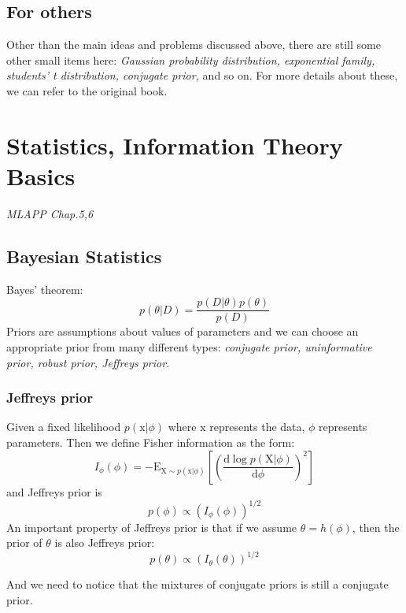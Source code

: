 \documentclass{article}
\newcommand{\mrm}{\mathrm}
\begin{document}
\subsection*{For others}
Other than the main ideas and problems discussed above, there are still some other small items here: \emph{Gaussian probability distribution, exponential family, students' t distribution, conjugate prior, } and so on. For more details about these, we can refer to the original book. 

\section{Statistics, Information Theory Basics}
\emph{MLAPP Chap.5,6}
\subsection*{Bayesian Statistics}
Bayes' theorem: 
\begin{equation}
    p(\theta|D)=\frac{p(D|\theta)p(\theta)}{p(D)}
\end{equation}
Priors are assumptions about values of parameters and we can choose an appropriate prior from many different types: \emph{conjugate prior, uninformative prior, robust prior, Jeffreys prior}. 
\subsubsection*{Jeffreys prior}
Given a fixed likelihood $p(\mrm x|\phi)$ where $\mrm x$ represents the data, $\phi$ represents parameters. Then we define Fisher information as the form:
\begin{equation}
    I_{\phi}(\phi)=-\mrm E_{\mrm X\sim p(\mrm x|\phi)}[(\frac{\mrm d\log p(\mrm X|\phi)}{\mrm d\phi})^2]
\end{equation}
and Jeffreys prior is 
\begin{equation}
    p(\phi)\propto(I_{\phi}(\phi))^{1/2}
\end{equation}
An important property of Jeffreys prior is that if we assume $\theta=h(\phi)$, then the prior of $\theta$ is also Jeffreys prior:
\begin{equation}
    p(\theta)\propto (I_{\theta}(\theta))^{1/2}
\end{equation}

And we need to notice that the mixtures of conjugate priors is still a conjugate prior.
\end{document}
